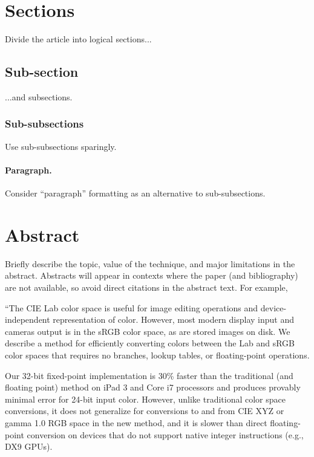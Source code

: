 \documentclass{jcgt}
\begin{document}
\section{Sections}
Divide the article into logical sections...

\subsection{Sub-section}
...and subsections.

\subsubsection{Sub-subsections}
Use sub-subsections sparingly.

\paragraph{Paragraph.} Consider ``paragraph'' formatting as an alternative to sub-subsections.


\section{Abstract}
Briefly describe the topic, value of the technique, and major limitations in the abstract. Abstracts will appear in contexts where the paper (and bibliography) are not available, so avoid direct citations in the abstract text. For example,

``The CIE Lab color  space is useful for image editing operations and device-independent representation of
color.  However, most modern display  input  and  cameras  output is in the sRGB color space, as are stored images on disk.  We describe a method for
efficiently converting colors between the Lab and sRGB color spaces that requires no branches,  lookup tables, or floating-point operations.

Our 32-bit fixed-point
implementation is 30\% faster than the traditional (and floating point) method on
iPad 3 and Core i7 processors and produces provably
minimal error for 24-bit input color.  However,  unlike traditional color space
conversions, it does not generalize for conversions to and from CIE XYZ or
gamma 1.0 RGB space in the new method, and it is slower than direct floating-point
conversion on devices that do not support native integer instructions (e.g., DX9 GPUs).
\end{document}
